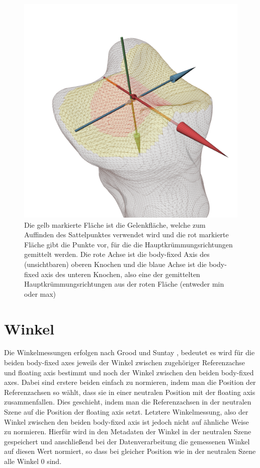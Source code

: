 \documentclass[a4paper, openany, oneside]{memoir}
\begin{document}
\begin{figure}
\begin{center}
\includegraphics[width = \textwidth, height = 0.4\textheight, keepaspectratio]{vis_1}
\caption{Die gelb markierte Fläche ist die Gelenkfläche, welche zum Auffinden des Sattelpunktes verwendet wird und die rot markierte Fläche gibt die Punkte vor, für die die Hauptkrümmungsrichtungen gemittelt werden. Die rote Achse ist die body-fixed Axis des (unsichtbaren) oberen Knochen und die blaue Achse ist die body-fixed axis des unteren Knochen, also eine der gemittelten Hauptkrümmungsrichtungen aus der roten Fläche (entweder min oder max) }
\label{fig:vis_axes}
\end{center}
\end{figure}


\section{Winkel}
Die Winkelmessungen erfolgen nach Grood und Suntay \cite{grood1983joint}, bedeutet es wird für die beiden body-fixed axes jeweils der Winkel zwischen zugehöriger Referenzachse und floating axis bestimmt und noch der Winkel zwischen den beiden body-fixed axes. Dabei sind erstere beiden einfach zu normieren, indem man die Position der Referenzachsen so wählt, dass sie in einer neutralen Position mit der floating axis zusammenfallen. Dies geschieht, indem man die Referenzachsen in der neutralen Szene auf die Position der floating axis setzt. Letztere Winkelmessung, also der Winkel zwischen den beiden body-fixed axis ist jedoch nicht auf ähnliche Weise zu normieren. Hierfür wird in den Metadaten der Winkel in der neutralen Szene gespeichert und anschließend bei der Datenverarbeitung die gemessenen Winkel auf diesen Wert normiert, so dass bei gleicher Position wie in der neutralen Szene alle Winkel 0 sind. 



\end{document}
